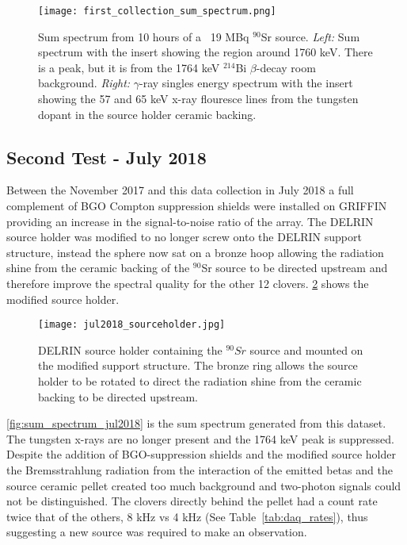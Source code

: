 \documentclass[cnatzke_thesis_proposal.tex]{subfiles}
\begin{document}
\begin{figure}[htbp]
  \centering
  \texttt{[image: first\_collection\_sum\_spectrum.png]}
  \caption{Sum spectrum from 10 hours of a ~19 MBq $^{90}$Sr source.
    \textit{Left:} Sum spectrum with the insert showing the region around 1760 keV. There is a peak, but it is from the 1764 keV $^{214}$Bi $\beta$-decay room background.
    \textit{Right:} $\gamma$-ray singles energy spectrum with the insert showing the 57 and 65 keV x-ray flouresce lines from the tungsten dopant in the source holder ceramic backing.
  }
  \label{fig:sum_spectrum_jul2017}
\end{figure}

\subsection{Second Test - July 2018}
Between the November 2017 and this data collection in July 2018 a full complement of BGO Compton suppression shields were installed on GRIFFIN providing an increase in the signal-to-noise ratio of the array.
The DELRIN source holder was modified to no longer screw onto the DELRIN support structure, instead the sphere now sat on a bronze hoop allowing the radiation shine from the ceramic backing of the $^{90}$Sr source to be directed upstream and therefore improve the spectral quality for the other 12 clovers.
\ref{fig:source_holder_jul2018} shows the modified source holder.

\begin{figure}[htbp]
  \centering
  \texttt{[image: jul2018\_sourceholder.jpg]}
  \caption{DELRIN source holder containing the $^{90}Sr$ source and mounted on the modified support structure. The bronze ring allows the source holder to be rotated to direct the radiation shine from the ceramic backing to be directed upstream.}
  \label{fig:source_holder_jul2018}
\end{figure}

\ref{fig:sum_spectrum_jul2018} is the sum spectrum generated from this dataset. 
The tungsten x-rays are no longer present and the 1764 keV peak is suppressed. 
Despite the addition of BGO-suppression shields and the modified source holder the Bremsstrahlung radiation from the interaction of the emitted betas and the source ceramic pellet created too much background and two-photon signals could not be distinguished.
The clovers directly behind the pellet had a count rate twice that of the others, 8 kHz vs 4 kHz (See Table~\ref{tab:daq_rates}), thus suggesting a new source was required to make an observation.
\end{document}
